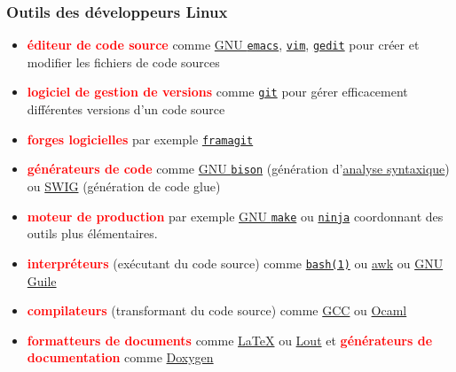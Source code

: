 \documentclass[xcolor=svgnames,final,smaller,a4]{beamer}
\begin{document}
\begin{frame}
  \frametitle{Outils des développeurs Linux}

  \begin{relsize}{-1}
  \begin{itemize}

  \item  \textbf{\textcolor{red}{éditeur de code source}} comme \href{https://www.gnu.org/software/emacs/}{GNU \texttt{emacs}},
    \href{https://vim.org/}{\texttt{vim}}, \href{https://help.gnome.org/users/gedit/}{\texttt{gedit}} pour créer et modifier les fichiers de code sources


  \item  \textbf{\textcolor{red}{logiciel de gestion de versions}} comme \href{https://fr.wikipedia.org/wiki/Git}{\texttt{git}} pour gérer efficacement différentes versions d'un code source
\
\item  \textbf{\textcolor{red}{forges logicielles}} par exemple  \href{https://framagit.org/}{\texttt{framagit}}

  \item  \textbf{\textcolor{red}{générateurs de code}} comme
    \href{https://fr.wikipedia.org/wiki/GNU\_Bison}{GNU
      \texttt{bison}} (génération
    d'\href{https://fr.wikipedia.org/wiki/Analyse_syntaxique}{analyse
      syntaxique}) ou \href{https://fr.wikipedia.org/wiki/SWIG}{SWIG}
    (génération de code glue)
   
  \item  \textbf{\textcolor{red}{moteur de production}} par exemple \href{https://fr.wikipedia.org/wiki/Make}{GNU \texttt{make}} ou \href{https://ninja-build.org}{\texttt{ninja}} coordonnant des outils plus élémentaires.
  \item \textbf{\textcolor{red}{interpréteurs}} (exécutant du code
    source) comme
    \href{https://man7.org/linux/man-pages/man1/bash.1.html}{\texttt{bash(1)}}
    ou \href{https://fr.wikipedia.org/wiki/Awk}{awk} ou
    \href{https://fr.wikipedia.org/wiki/GNU_Guile}{GNU Guile}
  \item  \textbf{\textcolor{red}{compilateurs}} (transformant du code source) comme \href{http://gcc.gnu.org/}{GCC} ou \href{http://ocaml.org/}{Ocaml}
  \item \textbf{\textcolor{red}{formatteurs de documents}} comme
    \href{https://fr.wikipedia.org/wiki/LaTeX}{\LaTeX} ou
    \href{https://fr.wikipedia.org/wiki/Lout}{Lout} et  \textbf{\textcolor{red}{générateurs de documentation}}
    comme \href{https://fr.wikipedia.org/wiki/Doxygen}{Doxygen}



\end{itemize}
\end{relsize}
\end{frame}
\end{document}
